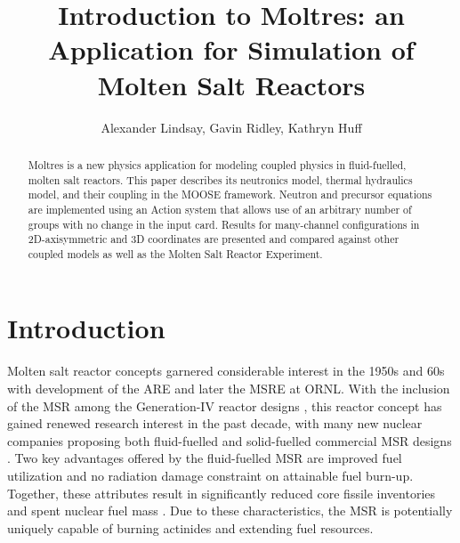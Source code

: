 \documentclass{article}
\title{Introduction to Moltres: an Application for Simulation of Molten Salt Reactors}
\author{Alexander Lindsay, Gavin Ridley, Kathryn Huff}
\let\Oldsection\section
\renewcommand{\section}{\FloatBarrier\Oldsection}
\begin{document}
\maketitle

\begin{abstract}

Moltres is a new physics application for modeling coupled physics in 
fluid-fuelled, molten salt reactors. This paper describes its neutronics model, 
thermal hydraulics model, and their coupling in the MOOSE framework. Neutron 
and precursor equations are implemented using an Action system that allows use 
of an arbitrary number of groups with no change in the input card. Results for 
many-channel configurations in 2D-axisymmetric and 3D coordinates are presented 
and compared against other coupled models as well as the Molten Salt Reactor 
Experiment.

\end{abstract}

\section{Introduction}

Molten salt reactor concepts garnered considerable interest in the 1950s and 60s
with development of the \gls{ARE} and later the \gls{MSRE} at \gls{ORNL}.  With
the inclusion of the \gls{MSR} among the Generation-IV reactor designs
\cite{gif_generation_2008,gif_generation_2015}, this reactor concept has gained renewed research
interest in the past decade, with many new nuclear companies proposing both
fluid-fuelled and solid-fuelled commercial \gls{MSR} designs
\cite{hyde_liquid_2015,leblanc_integral_2015,thorcon_-able_2017,scarlat_design_2014,transatomic_power_corporation_neutronics_2016}. 
Two key advantages offered by the fluid-fuelled \gls{MSR} are improved fuel
utilization and no radiation damage constraint on attainable fuel
burn-up. Together, these attributes result in significantly reduced core fissile
inventories and spent nuclear fuel mass 
\cite{gif_generation_2008,gif_generation_2015}.  
Due to these characteristics, the \gls{MSR} is potentially uniquely capable of 
burning actinides and extending fuel resources.
\end{document}
